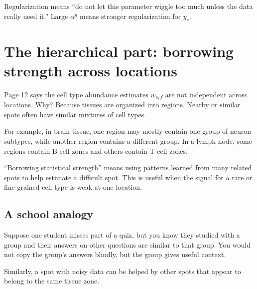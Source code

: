 \documentclass[11pt]{article}
\begin{document}
\begin{warningbox}
Regularization means ``do not let this parameter wiggle too much unless the data really need it.'' Large $\alpha^y$ means stronger regularization for $y_s$.
\end{warningbox}

\section{The hierarchical part: borrowing strength across locations}

Page 12 says the cell type abundance estimates $w_{s,f}$ are not independent across locations. Why? Because tissues are organized into regions. Nearby or similar spots often have similar mixtures of cell types.

For example, in brain tissue, one region may mostly contain one group of neuron subtypes, while another region contains a different group. In a lymph node, some regions contain B-cell zones and others contain T-cell zones.

\begin{bigidea}
``Borrowing statistical strength'' means using patterns learned from many related spots to help estimate a difficult spot. This is useful when the signal for a rare or fine-grained cell type is weak at one location.
\end{bigidea}

\subsection{A school analogy}

Suppose one student misses part of a quiz, but you know they studied with a group and their answers on other questions are similar to that group. You would not copy the group's answers blindly, but the group gives useful context.

Similarly, a spot with noisy data can be helped by other spots that appear to belong to the same tissue zone.
\end{document}
